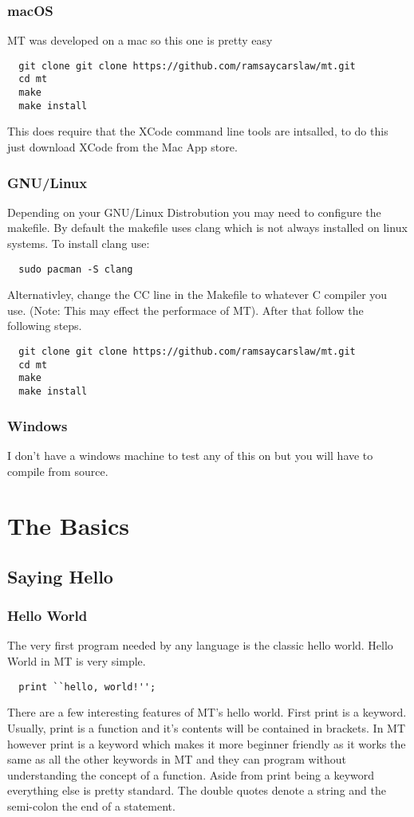 \documentclass{report}
\begin{document}
\subsection{macOS}
MT was developed on a mac so this one is pretty easy
\begin{lstlisting}
  git clone git clone https://github.com/ramsaycarslaw/mt.git
  cd mt
  make
  make install
\end{lstlisting}
This does require that the XCode command line tools are intsalled, to do this just download XCode from the Mac App store.

\subsection{GNU/Linux}
Depending on your GNU/Linux Distrobution you may need to configure the makefile. By default the makefile uses clang which is not always installed on linux systems. To install clang use:
\begin{lstlisting}
  sudo pacman -S clang
\end{lstlisting}

Alternativley, change the CC line in the Makefile to whatever C compiler you use. (Note: This may effect the performace of MT). After that follow the following steps.
\begin{lstlisting}
  git clone git clone https://github.com/ramsaycarslaw/mt.git
  cd mt
  make
  make install
\end{lstlisting}

\subsection{Windows}
I don't have a windows machine to test any of this on but you will have to compile from source.

\chapter{The Basics}
\section{Saying Hello}
\subsection{Hello World}
The very first program needed by any language is the classic hello world. Hello World in MT is very simple.
\begin{lstlisting}
  print ``hello, world!'';
\end{lstlisting}
There are a few interesting features of MT's hello world. First print is a keyword. Usually, print is a function and it's contents will be contained in brackets. In MT however print is a keyword which makes it more beginner friendly as it works the same as all the other keywords in MT and they can program without understanding the concept of a function. Aside from print being a keyword everything else is pretty standard. The double quotes denote a string and the semi-colon the end of a statement.
\end{document}

